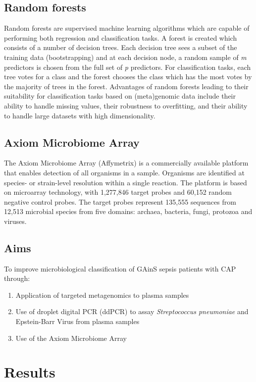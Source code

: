 \subsection{Random forests}
Random forests are supervised machine learning algorithms which are capable of performing both regression and classification tasks. A forest is created which consists of a number of decision trees. Each decision tree sees a subset of the training data (bootstrapping) and at each decision node, a random sample of \textit{m} predictors is chosen from the full set of \textit{p} predictors. For classification tasks, each tree votes for a class and the forest chooses the class which has the most votes by the majority of trees in the forest. Advantages of random forests leading to their suitability for classification tasks based on (meta)genomic data include their ability to handle missing values, their robustness to overfitting, and their ability to handle large datasets with high dimensionality. 

\subsection{Axiom Microbiome Array}
The Axiom Microbiome Array (Affymetrix) is a commercially available platform that enables detection of all organisms in a sample. Organisms are identified at species- or strain-level resolution within a single reaction. The platform is based on microarray technology, with 1,277,846 target probes and 60,152 random negative control probes. The target probes represent 135,555 sequences from 12,513 microbial species from five domains: archaea, bacteria, fungi, protozoa and viruses. 

\subsection{Aims}

To improve microbiological classification of GAinS sepsis patients with CAP through:
\begin{enumerate}
	\item Application of targeted metagenomics to plasma samples
	\item Use of droplet digital PCR (ddPCR) to assay \textit{Streptococcus pneumoniae} and Epstein-Barr Virus from plasma samples
	\item Use of the Axiom Microbiome Array
\end{enumerate}

\section{Results}

